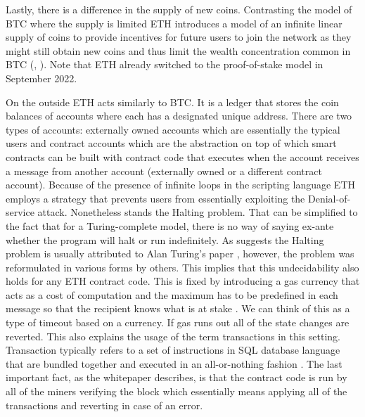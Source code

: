 Lastly, there is a difference in the supply of new coins.
Contrasting the model of \ac{BTC} where the supply is limited \ac{ETH} introduces 
a model of an infinite linear supply of coins to provide incentives 
for future users to join the network as they might still obtain 
new coins and thus limit the wealth concentration common in \ac{BTC} (\cite{buterin2013ethereum}, \cite{Tikhomirov2018}).
Note that \ac{ETH} already switched to the proof-of-stake model in September 2022.


On the outside \ac{ETH} acts similarly to \ac{BTC}. It is a ledger
that stores the coin balances of accounts where each has a designated unique address.
There are two types of accounts: externally owned accounts which are essentially
the typical users and contract accounts which are the abstraction on top of which
smart contracts can be built with contract code that executes when the account receives
a message from another account (externally owned or a different contract account).
Because of the presence of infinite loops in the scripting language \ac{ETH} employs
a strategy that prevents users from essentially exploiting the Denial-of-service attack.
Nonetheless stands the Halting problem. That can be simplified to the fact
that for a Turing-complete model, there is no way of saying ex-ante whether the program will
halt or run indefinitely. As \cite{Lucas2021} suggests the Halting problem
is usually attributed to Alan Turing's paper 
\cite[On computable numbers, with an application to the Entscheidungsproblem]{turing1936computable},
however, the problem was reformulated in various forms by others. This implies
that this undecidability also holds for any \ac{ETH} contract code.
This is fixed by introducing a gas currency that acts as a cost of computation 
and the maximum has to be predefined in each 
message so that the recipient knows what is at stake \citep{buterin2013ethereum}. 
We can think of this as a type of timeout based on a currency. If gas runs
out all of the state changes are reverted. This also explains the usage 
of the term 
transactions in this setting. 
Transaction typically refers to a set of instructions in SQL database language that
are bundled together and executed in an all-or-nothing fashion \citep{Kleppmann2017}.
The last important fact, as the whitepaper describes, is that the contract code is run by
all of the miners verifying the block which essentially means applying all of the
transactions and reverting in case of an error.


